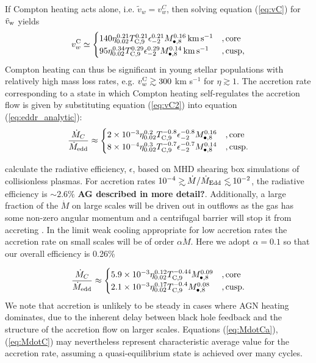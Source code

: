 \documentclass[usenatbib,fleqn]{mn2e}
\newcommand{\Mdot}{\dot{M}}
\newcommand{\eddr}{\dot{M}/\dot{M}_{\rm Edd}}
\newcommand\lsim{\mathrel{\rlap{\lower4pt\hbox{\hskip1pt$\sim$}}
    \raise1pt\hbox{$<$}}}
\newcommand\gsim{\mathrel{\rlap{\lower4pt\hbox{\hskip1pt$\sim$}}
    \raise1pt\hbox{$>$}}}
\begin{document}
If Compton heating acts alone, i.e. $\tilde{v}_{w} = v_{w}^{C}$, then
solving equation (\ref{eq:vC}) for $\tilde{v}_{\rm w}$ yields
\begin{align} v_{w}^{\rm C} \simeq
  \begin{cases} 140 \eta_{0.02}^{0.21}T_{\rm
C,9}^{0.21}\epsilon_{-2}^{0.21} M_{\bullet,8}^{0.16}\,{\rm km\,s^{-1}}
&, \text{core}\\ 95 \eta_{0.02}^{0.34}T_{\rm
C,9}^{0.29}\epsilon_{-2}^{0.29} M_{\bullet,8}^{0.14}\,{\rm km\,s^{-1}}
&, \text{cusp},
  \end{cases}
  \label{eq:vC2}
\end{align} 
Compton heating can thus be significant in young stellar populations
with relatively high mass loss rates, e.g. $v_{w}^{\rm C} \gtrsim 300$
km s$^{-1}$ for $\eta \gtrsim 1$.  The accretion rate
corresponding to a state in which Compton heating self-regulates the accretion flow is given by substituting equation (\ref{eq:vC2}) into equation (\ref{eq:eddr_analytic}):
\begin{align}
\frac{\dot{M}_{C}}{\dot{M}_{\rm edd}} \approx 
\begin{cases} 2\times 10^{-3} \eta_{0.02}^{0.2}T_{\rm
C,9}^{-0.8}\epsilon_{-2}^{-0.8} M_{\bullet,8}^{0.16}
&, \text{core}\\ 8\times 10^{-4} \eta_{0.02}^{0.3}T_{\rm
C,9}^{-0.7}\epsilon_{-2}^{-0.7} M_{\bullet,8}^{0.14}
&, \text{cusp}.
  \end{cases}
  \label{eq:MdotCa}
\end{align}

\citet{Sharma+2007} calculate the radiative efficiency, $\epsilon$,
based on MHD shearing box simulations of collisionless plasmas. For
accretion rates $10^{-4} \gsim \eddr \lsim 10^{-2}$, the radiative
efficiency is $\sim 2.6\%$ {\bf AG described in more
  detail?}. Additionally, a large fraction of the $\dot{M}$ on large scales
will be driven out in outflows as the gas has some non-zero angular
momentum and a centrifugal barrier will stop it from accreting
\citet{Li+2013}. In the limit weak cooling appropriate for low
accretion rates the accretion rate on small scales will be of order
$\alpha \Mdot$. Here we adopt $\alpha=0.1$ so that our overall
efficiency is 0.26\%

\begin{align}
\frac{\dot{M}_{C}}{\dot{M}_{\rm edd}} \approx 
\begin{cases} 5.9\times 10^{-3} \eta_{0.02}^{0.12}T_{\rm
C,9}^{-0.44}M_{\bullet,8}^{0.09}
&, \text{core}\\ 2.1\times 10^{-3} \eta_{0.02}^{0.17}T_{\rm
C,9}^{-0.4} M_{\bullet,8}^{0.08}
&, \text{cusp}.
  \end{cases}
  \label{eq:MdotC}
\end{align}
We note that accretion is unlikely to be steady in cases where AGN
heating dominates, due to the inherent delay between black hole
feedback and the structure of the accretion flow on larger scales.
Equations (\ref{eq:MdotCa}), (\ref{eq:MdotC}) may nevertheless
represent characteristic average value for the accretion rate,
assuming a quasi-equilibrium state is achieved over many cycles.
\end{document}
